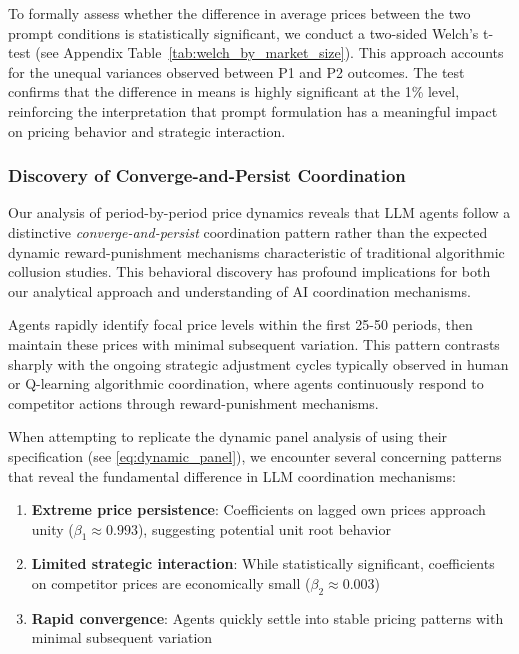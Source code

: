 To formally assess whether the difference in average prices between the two prompt conditions is statistically significant, we conduct a two-sided Welch's t-test (see Appendix Table~\ref{tab:welch_by_market_size}). This approach accounts for the unequal variances observed between P1 and P2 outcomes. The test confirms that the difference in means is highly significant at the 1\% level, reinforcing the interpretation that prompt formulation has a meaningful impact on pricing behavior and strategic interaction.

\subsubsection*{Discovery of Converge-and-Persist Coordination}

Our analysis of period-by-period price dynamics reveals that LLM agents follow a distinctive \emph{converge-and-persist} coordination pattern rather than the expected dynamic reward-punishment mechanisms characteristic of traditional algorithmic collusion studies. This behavioral discovery has profound implications for both our analytical approach and understanding of AI coordination mechanisms.

Agents rapidly identify focal price levels within the first 25-50 periods, then maintain these prices with minimal subsequent variation. This pattern contrasts sharply with the ongoing strategic adjustment cycles typically observed in human or Q-learning algorithmic coordination, where agents continuously respond to competitor actions through reward-punishment mechanisms.

When attempting to replicate the dynamic panel analysis of \textcite{fish_algorithmic_2025} using their specification (see \ref{eq:dynamic_panel}), we encounter several concerning patterns that reveal the fundamental difference in LLM coordination mechanisms:
\begin{enumerate}[noitemsep]
    \item \textbf{Extreme price persistence}: Coefficients on lagged own prices approach unity ($\beta_1 \approx 0.993$), suggesting potential unit root behavior
    \item \textbf{Limited strategic interaction}: While statistically significant, coefficients on competitor prices are economically small ($\beta_2 \approx 0.003$)
    \item \textbf{Rapid convergence}: Agents quickly settle into stable pricing patterns with minimal subsequent variation
\end{enumerate}

